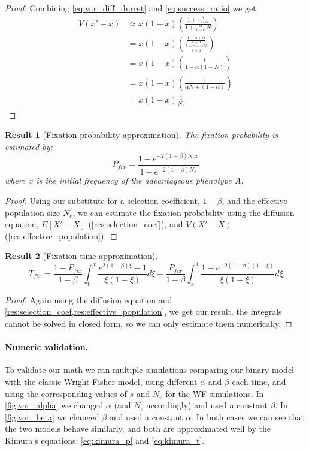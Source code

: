 \documentclass[12pt]{extarticle}
\newtheorem{result}{Result}
\begin{document}
\begin{proof}
Combining \cref{eq:var_diff_durret} and \cref{eq:success_ratio} we get:
\begin{equation}\label{eq:const_var}
\begin{split}
V(x'-x) & \approx x(1-x)(\frac{1 + \frac{\alpha}{1-\alpha}}{1 + \frac{\alpha}{1-\alpha} N})\\
 &= x(1-x)(\frac{\frac{1-\alpha+\alpha}{1-\alpha}}{\frac{1-\alpha+\alpha N}{1-\alpha}})\\
 &= x(1-x)(\frac{1}{1- \alpha(1-N)})\\
  &= x(1-x)(\frac{1}{\alpha N + (1-\alpha)})\\
  &= x(1-x)\frac{1}{N_e}
\end{split}
\end{equation}
\end{proof}

\begin{result}[Fixation probability approximation]
The fixation probability is estimated by:
\begin{equation}\label{eq:kimura_p}
P_{fix} = \frac{1-e^{-2(1-\beta)N_e x}}{1-e^{-2(1-\beta)N_e}}
\end{equation}
where $x$ is the initial frequency of the advantageous phenotype $\hat{A}$.
\end{result}
\begin{proof}
Using our substitute for a selection coefficient, $1-\beta$, and the effective population size $N_e$, we can estimate the fixation probability using the diffusion equation, $E[X'-X]$ (\cref{res:selection_coef}), and $V(X'-X)$ (\cref{res:effective_population}).
\end{proof}

\begin{result}[Fixation time approximation]
\begin{equation}\label{eq:kimura_t}
T_{fix}=\frac{1-P_{fix}}{1-\beta}\int_0^x\frac{e^{2(1-\beta) \xi}-1}{\xi(1-\xi)}d\xi+ \frac{P_{fix}}{1-\beta}\int_x^1\frac{1-e^{-2(1-\beta)(1-\xi)}}{\xi(1-\xi)}d\xi
\end{equation}
\end{result}

\begin{proof}
Again using the diffusion equation and \cref{res:selection_coef,res:effective_population}, we get our result.
the integrals cannot be solved in closed form, so we can only estimate them numerically.
\end{proof}

\paragraph{Numeric validation.}
To validate our math we ran multiple simulations comparing our binary model with the classic Wright-Fisher model, using different $\alpha$ and $\beta$ each time, and using the corresponding values of $s$ and $N_e$ for the WF simulations.
In \cref{fig:var_alpha} we changed $\alpha$ (and $N_e$ accordingly) and used a constant $\beta$.
In \cref{fig:var_beta} we changed $\beta$ and used a constant $\alpha$.
In both cases we can see that the two models behave similarly, and both are approximated well by the Kimura's equations: \cref{eq:kimura_p} and \cref{eq:kimura_t}.
\end{document}
